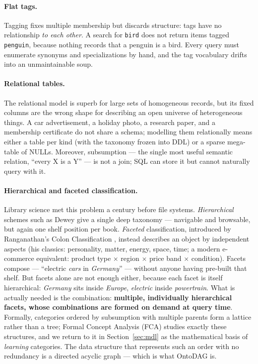\documentclass[10pt,twocolumn]{article}
\begin{document}
\paragraph{Flat tags.}
Tagging fixes multiple membership but discards structure: tags have no
relationship \emph{to each other}. A search for \texttt{bird} does not
return items tagged \texttt{penguin}, because nothing records that a
penguin is a bird. Every query must enumerate synonyms and
specializations by hand, and the tag vocabulary drifts into an
unmaintainable soup.

\paragraph{Relational tables.}
The relational model \cite{codd1970} is superb for large sets of
homogeneous records, but its fixed columns are the wrong shape for
describing an open universe of heterogeneous things. A car advertisement,
a holiday photo, a research paper, and a membership certificate do not
share a schema; modelling them relationally means either a table per kind
(with the taxonomy frozen into DDL) or a sparse mega-table of NULLs.
Moreover, subsumption --- the single most useful semantic relation,
``every X is a Y'' --- is not a join; SQL can store it but cannot
naturally query with it.

\paragraph{Hierarchical and faceted classification.}
Library science met this problem a century before file systems.
\emph{Hierarchical} schemes such as Dewey give a single deep taxonomy ---
navigable and browsable, but again one shelf position per book.
\emph{Faceted} classification, introduced by Ranganathan's Colon
Classification \cite{ranganathan1933}, instead describes an object by
independent aspects (his classics: personality, matter, energy, space,
time; a modern e-commerce equivalent: product type $\times$ region
$\times$ price band $\times$ condition). Facets compose --- ``electric
\emph{cars} in \emph{Germany}'' --- without anyone having pre-built that
shelf. But facets alone are not enough either, because each facet is
itself hierarchical: \emph{Germany} sits inside \emph{Europe},
\emph{electric} inside \emph{powertrain}. What is actually needed is the
combination: \textbf{multiple, individually hierarchical facets, whose
combinations are formed on demand at query time}. Formally, categories
ordered by subsumption with multiple parents form a lattice rather than a
tree; Formal Concept Analysis (FCA) \cite{wille1982,ganter1999} studies
exactly these structures, and we return to it in Section~\ref{sec:mdl} as
the mathematical basis of \emph{learning} categories. The data structure
that represents such an order with no redundancy is a directed acyclic
graph --- which is what OntoDAG is.
\end{document}
